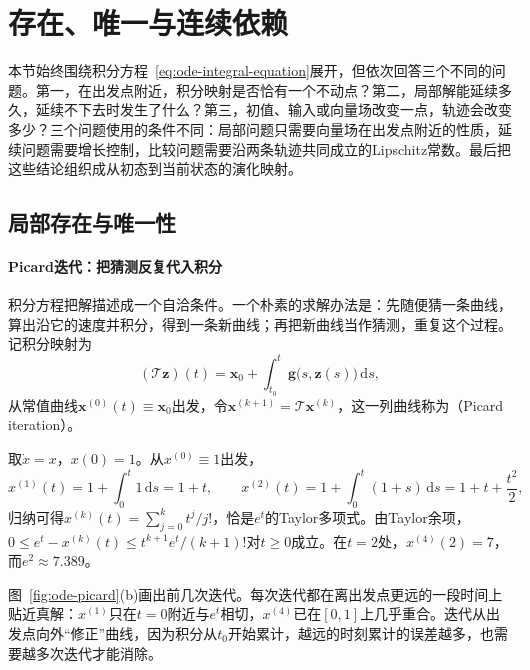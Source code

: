 
\section{存在、唯一与连续依赖}
\label{sec:ode-well-posedness}

本节始终围绕积分方程~\eqref{eq:ode-integral-equation}展开，但依次回答三个不同的问题。第一，在出发点附近，积分映射是否恰有一个不动点？第二，局部解能延续多久，延续不下去时发生了什么？第三，初值、输入或向量场改变一点，轨迹会改变多少？三个问题使用的条件不同：局部问题只需要向量场在出发点附近的性质，延续问题需要增长控制，比较问题需要沿两条轨迹共同成立的Lipschitz常数。最后把这些结论组织成从初态到当前状态的演化映射。

\subsection{局部存在与唯一性}
\label{sec:ode-local-existence}

\paragraph{Picard迭代：把猜测反复代入积分}
积分方程把解描述成一个自洽条件。一个朴素的求解办法是：先随便猜一条曲线，算出沿它的速度并积分，得到一条新曲线；再把新曲线当作猜测，重复这个过程。记积分映射为
\begin{equation}
  (\mathcal T\bm z)(t)=\bm x_0+\int_{t_0}^t\bm g\bigl(s,\bm z(s)\bigr)\,\mathrm ds,
  \label{eq:ode-picard-map}
\end{equation}
从常值曲线$\bm x^{(0)}(t)\equiv\bm x_0$出发，令$\bm x^{(k+1)}=\mathcal T\bm x^{(k)}$，这一列曲线称为（Picard iteration）。

\begin{example}[指数函数的Picard迭代]
  \label{ex:ode-picard-exponential}
  取$\dot x=x$，$x(0)=1$。从$x^{(0)}\equiv1$出发，
  \[
    x^{(1)}(t)=1+\int_0^t1\,\mathrm ds=1+t,\qquad
    x^{(2)}(t)=1+\int_0^t(1+s)\,\mathrm ds=1+t+\frac{t^2}{2},
  \]
  归纳可得$x^{(k)}(t)=\sum_{j=0}^kt^j/j!$，恰是$e^t$的Taylor多项式。由Taylor余项，$0\leq e^t-x^{(k)}(t)\leq t^{k+1}e^t/(k+1)!$对$t\geq0$成立。在$t=2$处，$x^{(4)}(2)=7$，而$e^2\approx7.389$。
\end{example}

图~\ref{fig:ode-picard}(b)画出前几次迭代。每次迭代都在离出发点更远的一段时间上贴近真解：$x^{(1)}$只在$t=0$附近与$e^t$相切，$x^{(4)}$已在$[0,1]$上几乎重合。迭代从出发点向外“修正”曲线，因为积分从$t_0$开始累计，越远的时刻累计的误差越多，也需要越多次迭代才能消除。

